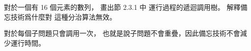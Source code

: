 \startEXERCISE
對於一個有 16 個元素的數列，
畫出節 2.3.1 中  運行過程的遞迴調用樹。
解釋備忘技術爲什麼對  這種分治算法無效。
\stopEXERCISE

\startANSWER
{} 對於每個子問題只會調用一次，
也就是說子問題不會重疊，因此備忘技術不會減少運行時間。

\externalfigure[e14_3_2-1]
\stopANSWER
